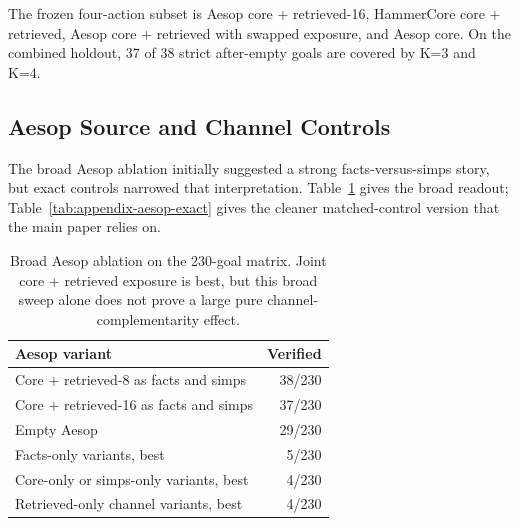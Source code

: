 \documentclass{article}
\begin{document}
\begin{table}[H]
\caption{Frozen retrieved-only portfolio on two disjoint fresh folds. The combined row is the prospective 432-goal result reported in the main paper.}
\label{tab:appendix-fresh}
\centering
\small
{}
\end{table}

The frozen four-action subset is Aesop core + retrieved-16, HammerCore core + retrieved, Aesop core + retrieved with swapped exposure, and Aesop core. On the combined holdout, 37 of 38 strict after-empty goals are covered by K=3 and K=4.

\subsection{Aesop Source and Channel Controls}

The broad Aesop ablation initially suggested a strong facts-versus-simps story, but exact controls narrowed that interpretation. Table~\ref{tab:appendix-aesop-broad} gives the broad readout; Table~\ref{tab:appendix-aesop-exact} gives the cleaner matched-control version that the main paper relies on.

\begin{table}[H]
\caption{Broad Aesop ablation on the 230-goal matrix. Joint core + retrieved exposure is best, but this broad sweep alone does not prove a large pure channel-complementarity effect.}
\label{tab:appendix-aesop-broad}
\centering
\small
\begin{tabular}{lr}
\toprule
Aesop variant & Verified \\
\midrule
Core + retrieved-8 as facts and simps & 38/230 \\
Core + retrieved-16 as facts and simps & 37/230 \\
Empty Aesop & 29/230 \\
Facts-only variants, best & 5/230 \\
Core-only or simps-only variants, best & 4/230 \\
Retrieved-only channel variants, best & 4/230 \\
\bottomrule
\end{tabular}
\end{table}
\end{document}
